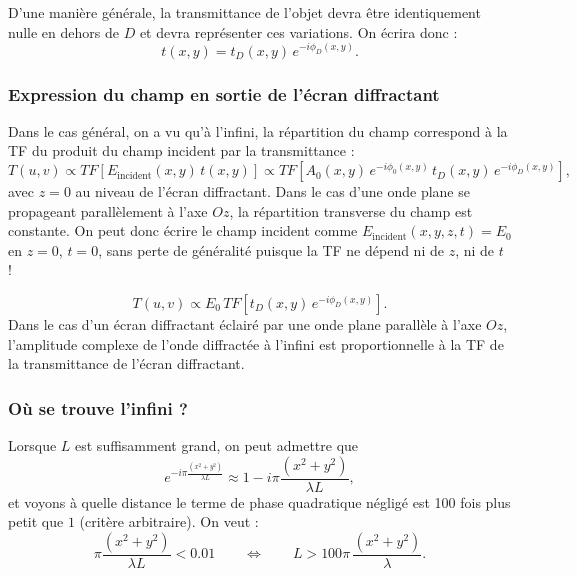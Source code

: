 \begin{definition}[Transmittance]
  D'une manière générale, la transmittance de l'objet devra être identiquement
  nulle en dehors de $D$ et devra représenter ces variations. On écrira donc :
  \[
    t(x,y) = t_D(x,y)\, e^{-i\phi_D(x,y)} .
  \]
\end{definition}

\subsubsection{Expression du champ en sortie de l'écran diffractant}
Dans le cas général, on a vu qu'à l'infini, la répartition du champ correspond à
la TF du produit du champ incident par la transmittance :
\begin{equation*}
  T(u,v) \propto TF\!\left[E_{\text{incident}}(x,y)\, t(x,y)\right]
         \propto TF\!\left[A_0(x,y)\, e^{-i\phi_0(x,y)}\,
                           t_D(x,y)\, e^{-i\phi_D(x,y)}\right],
\end{equation*}
avec $z = 0$ au niveau de l'écran diffractant. Dans le cas d'une onde plane se
propageant parallèlement à l'axe $Oz$, la répartition transverse du champ est
constante. On peut donc écrire le champ incident comme
$E_{\text{incident}}(x,y,z,t) = E_0$ en $z=0$, $t=0$, sans perte de généralité
puisque la TF ne dépend ni de $z$, ni de $t$ !

\begin{corollary}
  \[
    T(u,v) \propto E_0\, TF\!\left[t_D(x,y)\, e^{-i\phi_D(x,y)}\right].
  \]
  Dans le cas d'un écran diffractant éclairé par une onde plane parallèle à
  l'axe $Oz$, l'amplitude complexe de l'onde diffractée à l'infini est
  proportionnelle à la TF de la transmittance de l'écran diffractant.
\end{corollary}

\subsubsection{Où se trouve l'infini ?}
Lorsque $L$ est suffisamment grand, on peut admettre que
\begin{equation*}
  e^{-i\pi\frac{(x^2+y^2)}{\lambda L}} \approx 1 - i\pi\frac{(x^2+y^2)}{\lambda L},
\end{equation*}
et voyons à quelle distance le terme de phase quadratique négligé est 100 fois
plus petit que $1$ (critère arbitraire). On veut :
\begin{equation*}
  \pi\frac{(x^2+y^2)}{\lambda L} < 0.01
  \qquad\Longleftrightarrow\qquad
  L > 100\pi\, \frac{(x^2+y^2)}{\lambda}.
\end{equation*}


